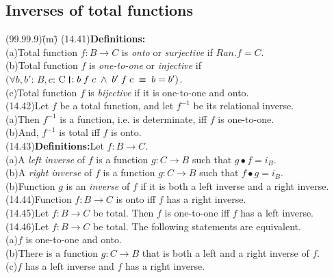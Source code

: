 \documentclass{amsart}
\newcommand{\lgap}{2pt}                             %
\newcommand{\llgap}{6pt}                            %
\newcommand{\equivs}{\ensuremath{\;\equiv\;}}       %
\newcommand{\thedr}{\rule[-.25ex]{.32mm}{1.75ex}}   %
\newcommand{\drrb}{\;\thedr\,{:}\;}                 %
\newcommand{\all}{\forall}                          %
\begin{document}
\subsection*{Inverses of total functions}
\begin{tabbing}
(99.99.9)\;\=(m)\;\=\kill
(14.41)\>\textbf{Definitions:}\\[\lgap]
       \>(a)\>Total function $f:B\to C$ is \emph{onto} or \emph{surjective} if $Ran.f=C$.\\[\lgap]
       \>(b)\>Total function $f$ is \emph{one-to-one} or \emph{injective} if\\[\lgap]
       \>   \>$(\all b,b'$: $B, c$: C$\drrb b\;f\;c \;\land\; b'\;f\;c \equivs b=b')$.\\[\lgap]
       \>(c)\>Total function $f$ is \emph{bijective} if it is one-to-one and onto.\\[\llgap]
(14.42)\>Let $f$ be a total function, and let $f^{-1}$ be its relational inverse.\\[\lgap]
       \>(a)\>Then $f^{-1}$ is a function, i.e. is determinate, iff $f$ is one-to-one.\\[\lgap]
       \>(b)\>And, $f^{-1}$ is total iff $f$ is onto.\\[\llgap]
(14.43)\>\textbf{Definitions:}\quad Let $f: B\to C$.\\[\lgap]
       \>(a)\>A \emph{left inverse} of $f$ is a function $g: C\to B$ such that $g\bullet f = i_{B}$.\\[\lgap]
       \>(b)\>A \emph{right inverse} of $f$ is a function $g: C\to B$ such that $f\bullet g = i_{B}$.\\[\lgap]
       \>(b)\>Function $g$ is an \emph{inverse} of $f$ if it is both a left inverse and a right inverse.\\[\llgap]
(14.44)\>Function $f: B\to C$ is onto iff $f$ has a right inverse.\\[\lgap]
(14.45)\>Let $f: B\to C$ be total. Then $f$ is one-to-one iff $f$ has a left inverse.\\[\llgap]
(14.46)\>Let $f: B\to C$ be total. The following statements are equivalent.\\[\lgap]
       \>(a)\>$f$ is one-to-one and onto.\\[\lgap]
       \>(b)\>There is a function $g: C\to B$ that is both a left and a right inverse of $f$.\\[\lgap]
       \>(c)\>$f$ has a left inverse and $f$ has a right inverse.\\[\llgap]
\end{tabbing}
\end{document}
